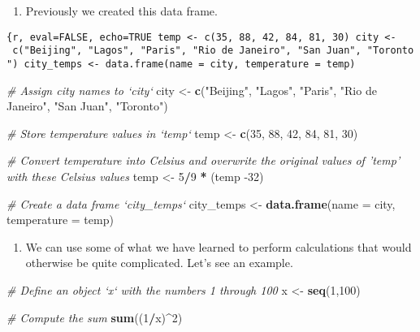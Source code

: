 \documentclass[]{article}
\newenvironment{Shaded}{\begin{snugshade}}{\end{snugshade}}
\newcommand{\CommentTok}[1]{\textcolor[rgb]{0.56,0.35,0.01}{\textit{#1}}}
\newcommand{\DataTypeTok}[1]{\textcolor[rgb]{0.13,0.29,0.53}{#1}}
\newcommand{\DecValTok}[1]{\textcolor[rgb]{0.00,0.00,0.81}{#1}}
\newcommand{\KeywordTok}[1]{\textcolor[rgb]{0.13,0.29,0.53}{\textbf{#1}}}
\newcommand{\NormalTok}[1]{#1}
\newcommand{\OperatorTok}[1]{\textcolor[rgb]{0.81,0.36,0.00}{\textbf{#1}}}
\newcommand{\StringTok}[1]{\textcolor[rgb]{0.31,0.60,0.02}{#1}}
\providecommand{\tightlist}{%
  \setlength{\itemsep}{0pt}\setlength{\parskip}{0pt}}
\begin{document}
\begin{enumerate}
\def\labelenumi{\arabic{enumi}.}
\tightlist
\item
  Previously we created this data frame.
\end{enumerate}

\texttt{\{r,\ eval=FALSE,\ echo=TRUE\ temp\ \textless{}-\ c(35,\ 88,\ 42,\ 84,\ 81,\ 30)\ city\ \textless{}-\ c("Beijing",\ "Lagos",\ "Paris",\ "Rio\ de\ Janeiro",\ "San\ Juan",\ "Toronto")\ city\_temps\ \textless{}-\ data.frame(name\ =\ city,\ temperature\ =\ temp)}

\begin{Shaded}
\begin{Highlighting}[]
\CommentTok{# Assign city names to `city` }
\NormalTok{city <-}\StringTok{ }\KeywordTok{c}\NormalTok{(}\StringTok{"Beijing"}\NormalTok{, }\StringTok{"Lagos"}\NormalTok{, }\StringTok{"Paris"}\NormalTok{, }\StringTok{"Rio de Janeiro"}\NormalTok{, }\StringTok{"San Juan"}\NormalTok{, }\StringTok{"Toronto"}\NormalTok{)}

\CommentTok{# Store temperature values in `temp`}
\NormalTok{temp <-}\StringTok{ }\KeywordTok{c}\NormalTok{(}\DecValTok{35}\NormalTok{, }\DecValTok{88}\NormalTok{, }\DecValTok{42}\NormalTok{, }\DecValTok{84}\NormalTok{, }\DecValTok{81}\NormalTok{, }\DecValTok{30}\NormalTok{)}

\CommentTok{# Convert temperature into Celsius and overwrite the original values of 'temp' with these Celsius values}
\NormalTok{temp <-}\StringTok{ }\DecValTok{5}\OperatorTok{/}\DecValTok{9} \OperatorTok{*}\StringTok{ }\NormalTok{(temp }\DecValTok{-32}\NormalTok{)}

\CommentTok{# Create a data frame `city_temps` }
\NormalTok{city_temps <-}\StringTok{ }\KeywordTok{data.frame}\NormalTok{(}\DataTypeTok{name =}\NormalTok{ city, }\DataTypeTok{temperature =}\NormalTok{ temp)}
\end{Highlighting}
\end{Shaded}

\begin{enumerate}
\def\labelenumi{\arabic{enumi}.}
\setcounter{enumi}{1}
\tightlist
\item
  We can use some of what we have learned to perform calculations that
  would otherwise be quite complicated. Let's see an example.
\end{enumerate}

\begin{Shaded}
\begin{Highlighting}[]
\CommentTok{# Define an object `x` with the numbers 1 through 100}
\NormalTok{x <-}\StringTok{ }\KeywordTok{seq}\NormalTok{(}\DecValTok{1}\NormalTok{,}\DecValTok{100}\NormalTok{)}

\CommentTok{# Compute the sum }
\KeywordTok{sum}\NormalTok{((}\DecValTok{1}\OperatorTok{/}\NormalTok{x)}\OperatorTok{^}\DecValTok{2}\NormalTok{)}
\end{Highlighting}
\end{Shaded}
\end{document}

